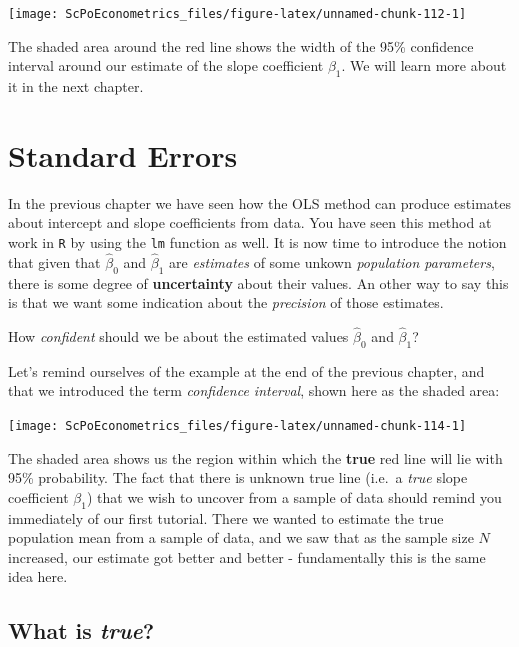 \documentclass[]{book}
\newenvironment{note}{\begin{tcolorbox}[colback=blue!5!white,colframe=blue!75!black,title=\textbf{Note:}]}{\end{tcolorbox}}
\theoremstyle{definition}
\theoremstyle{definition}
\theoremstyle{definition}
\theoremstyle{remark}
\begin{document}
\begin{center}\texttt{[image: ScPoEconometrics\_files/figure-latex/unnamed-chunk-112-1]} \end{center}

The shaded area around the red line shows the width of the 95\%
confidence interval around our estimate of the slope coefficient
\(\beta_1\). We will learn more about it in the next chapter.

\chapter{Standard Errors}\label{std-errors}

In the previous chapter we have seen how the OLS method can produce
estimates about intercept and slope coefficients from data. You have
seen this method at work in \texttt{R} by using the \texttt{lm} function
as well. It is now time to introduce the notion that given that
\(\hat{\beta}_0\) and \(\hat{\beta}_1\) are \emph{estimates} of some
unkown \emph{population parameters}, there is some degree of
\textbf{uncertainty} about their values. An other way to say this is
that we want some indication about the \emph{precision} of those
estimates.

\begin{note}
How \emph{confident} should we be about the estimated values
\(\hat{\beta}_0\) and \(\hat{\beta}_1\)?
\end{note}

 Let's remind ourselves of the example at the end of the previous
chapter, and that we introduced the term \emph{confidence interval},
shown here as the shaded area:

\begin{center}\texttt{[image: ScPoEconometrics\_files/figure-latex/unnamed-chunk-114-1]} \end{center}

The shaded area shows us the region within which the \textbf{true} red
line will lie with 95\% probability. The fact that there is unknown true
line (i.e.~a \emph{true} slope coefficient \(\beta_1\)) that we wish to
uncover from a sample of data should remind you immediately of our first
tutorial. There we wanted to estimate the true population mean from a
sample of data, and we saw that as the sample size \(N\) increased, our
estimate got better and better - fundamentally this is the same idea
here.

\section{\texorpdfstring{What is
\emph{true}?}{What is true?}}\label{what-is-true}
\end{document}
